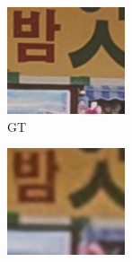 \begin{figure}[htbp]
    \captionsetup[subfigure]{labelformat=empty} 
    \begin{subfigure}{0.3\textwidth}
        \includegraphics[width=\linewidth]{imgs/GT_Canon_033.png}
        \caption{GT} 
    \end{subfigure}
    \hfill
    \begin{subfigure}{0.3\textwidth}
        \includegraphics[width=\linewidth]{imgs/STESRGAN_24.29_0.6954_Canon_033.png}

\end{subfigure}
\end{figure}
